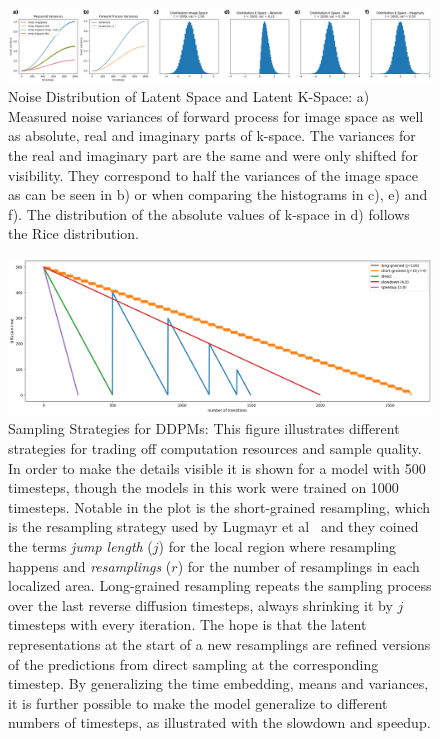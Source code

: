 \begin{figure}
    \centering
    \includegraphics[width=\textwidth]{images/kspacedistribution.png}
    \caption[Noise Distribution of Latent K-Space]{Noise Distribution of Latent Space and Latent K-Space: a) Measured noise variances of forward process for image space as well as absolute, real and imaginary parts of k-space. The variances for the real and imaginary part are the same and were only shifted for visibility. They correspond to half the variances of the image space as can be seen in b) or when comparing the histograms in c), e) and f). The distribution of the absolute values of k-space in d) follows the Rice distribution.}
    \label{fig:kspacedistribution}
\end{figure}

\begin{figure}
    \centering
    \includegraphics[width=\textwidth]{images/samplingstrategies.png}
    \caption[Sampling Strategies for DDPMs]{Sampling Strategies for DDPMs: This figure illustrates different strategies for trading off computation resources and sample quality. In order to make the details visible it is shown for a model with 500 timesteps, though the models in this work were trained on 1000 timesteps. Notable in the plot is the short-grained resampling, which is the resampling strategy used by Lugmayr et al~\autocite{lugmayr2022repaint} and they coined the terms \textit{jump length} ($j$) for the local region where resampling happens and \textit{resamplings} ($r$) for the number of resamplings in each localized area. Long-grained resampling repeats the sampling process over the last reverse diffusion timesteps, always shrinking it by $j$ timesteps with every iteration. The hope is that the latent representations at the start of a new resamplings are refined versions of the predictions from direct sampling at the corresponding timestep. By generalizing the time embedding, means and variances, it is further possible to make the model generalize to different numbers of timesteps, as illustrated with the slowdown and speedup.}
    \label{fig:stepsplot}
\end{figure}

